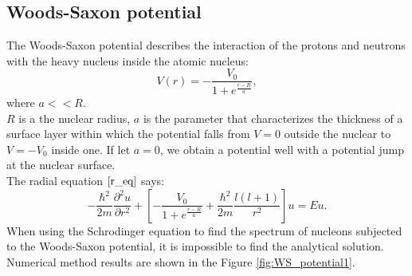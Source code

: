 \documentclass[a4paper, 11pt]{article}
\begin{document}
\subsection{Woods-Saxon potential}
The Woods-Saxon potential describes the interaction of the protons and neutrons with the heavy nucleus inside the atomic nucleus:
\begin{equation}
    V(r) = -\frac{V_0}{1+e^\frac{r-R}{a}},
\end{equation}
where $a<<R.$\\ 
$R$ is a the nuclear radius, $a$ is the parameter that characterizes the thickness of a surface layer within which the potential falls from $V=0$ outside the nuclear to  $V = -V_0$ inside one. If let $a=0$, we obtain a potential well with a potential jump at the nuclear surface. \\
The radial equation $\eqref{r_eq}$  says:
$$-\frac{\hbar^2}{2m}\frac{\partial^2 u}{\partial r^2}+[-\frac{V_0}{1+e^\frac{r-R}{a}}+\frac{\hbar^2}{2m}\frac{l(l+1)}{r^2}]u = Eu.$$
When using the Schrodinger equation to find the spectrum of nucleons subjected to the Woods-Saxon potential, it is impossible to find the analytical solution. Numerical method results are shown in the Figure \ref{fig:WS_potential1}.
\end{document}
